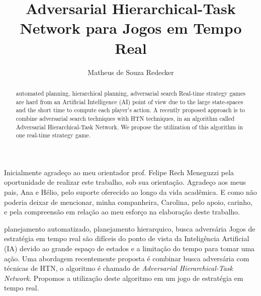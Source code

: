 \documentclass[portuguese,oneside]{tcc}
\author{Matheus de Souza Redecker}
\title{Adversarial Hierarchical-Task Network para Jogos em Tempo Real}
      {Adversarial Hierarchical-Task Network for Real-Time Games}
\begin{document}



\begin{agradecimentos}
Inicialmente agradeço ao meu orientador prof. Felipe Rech Meneguzzi pela oportunidade de realizar este trabalho, sob sua orientação. 
Agradeço aos meus pais, Ana e Hélio, pelo suporte oferecido ao longo da vida acadêmica. E como não poderia deixar de mencionar, minha companheira, Carolina, pelo apoio, carinho, e pela compreensão em relação ao meu esforço na elaboração deste trabalho.
\end{agradecimentos}

\begin{resumo}{planejamento automatizado, planejamento hierarquico, busca adversária}
Jogos de estratégia em tempo real são difíceis do ponto de vista da Inteligência Artificial (IA) devido ao grande espaço de estados e a limitação do tempo para tomar uma ação. 
Uma abordagem recentemente proposta é combinar busca adversária com técnicas de HTN, o algoritmo é chamado de \textit{Adversarial Hierarchical-Task Network}.
Propomos a utilização deste algoritmo em um jogo de estratégia em tempo real.
\end{resumo}

\begin{abstract}{automated planning, hierarchical planning, adversarial search}
Real-time strategy games are hard from an Artificial Intelligence (AI) point of view due to the large state-spaces and the short time to compute each player's action. 
A recently proposed approach is to combine adversarial search techniques with HTN techniques, in an algorithm called Adversarial Hierarchical-Task Network. 
We propose the utilization of this algorithm in one real-time strategy game.
\end{abstract}
\end{document}
